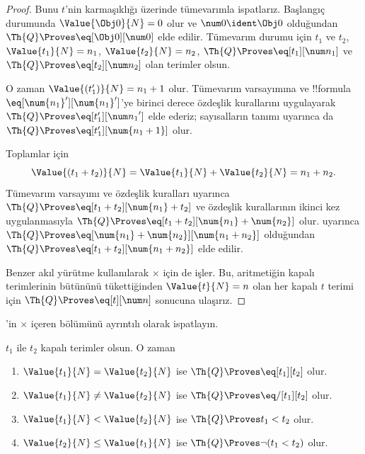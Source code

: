 \documentclass[../../../include/open-logic-section]{subfiles}
\begin{document}
\begin{proof}
Bunu $t$'nin karmaşıklığı üzerinde tümevarımla ispatlarız. Başlangıç
durumunda $\Value{\Obj 0}{N}=0$ olur ve $\num 0\ident\Obj 0$ olduğundan
$\Th{Q} \Proves \eq[\Obj 0][\num 0]$ elde edilir.
%
Tümevarım durumu için $t_1$ ve $t_2$,
$\Value{t_1}{N}=n_1$, $\Value{t_2}{N}=n_2$,
$\Th{Q} \Proves \eq[t_1][\num n_1]$ ve
$\Th{Q} \Proves \eq[t_2][\num n_2]$ olan terimler olsun.

O zaman $\Value{(t_1')}{N}=n_1+1$ olur. Tümevarım varsayımına ve
!!{formula} $\eq[\num{n_1}'][\num{n_1}']$'ye birinci derece özdeşlik
kurallarını uygulayarak $\Th{Q} \Proves \eq[t_1'][{\num n_1}']$ elde
ederiz; sayısalların tanımı uyarınca da
$\Th{Q} \Proves \eq[t_1'][\num{n_1+1}]$ olur.

Toplamlar için
\[
      \Value{(t_1 + t_2)}{N}
    = \Value{t_1}{N} + \Value{t_2}{N}
    = n_1 + n_2.
\]
Tümevarım varsayımı ve özdeşlik kuralları uyarınca
$\Th{Q} \Proves \eq[t_1+t_2][\num{n_1}+t_2]$ ve özdeşlik kurallarının
ikinci kez uygulanmasıyla
$\Th{Q} \Proves \eq[t_1+t_2][\num{n_1}+\num{n_2}]$ olur.
 uyarınca
$\Th{Q} \Proves \eq[\num{n_1}+\num{n_2}][\num{n_1+n_2}]$ olduğundan
$\Th{Q} \Proves \eq[t_1+t_2][\num{n_1+n_2}]$ elde edilir.

Benzer akıl yürütme  kullanılarak
$\times$ için de işler.
%
Bu, aritmetiğin kapalı terimlerinin bütününü tükettiğinden
$\Value{t}{N}=n$ olan her kapalı $t$ terimi için
$\Th{Q} \Proves \eq[t][\num n]$ sonucuna ulaşırız.
\end{proof}

\begin{prob}
'in $\times$ içeren bölümünü ayrıntılı olarak
ispatlayın.
\end{prob}

\begin{lem}
$t_1$ ile $t_2$ kapalı terimler olsun. O zaman
\begin{enumerate}
\item $\Value{t_1}{N}=\Value{t_2}{N}$ ise
    $\Th{Q} \Proves \eq[t_1][t_2]$ olur.
\item $\Value{t_1}{N}\neq\Value{t_2}{N}$ ise
    $\Th{Q} \Proves \eq/[t_1][t_2]$ olur.
\item $\Value{t_1}{N}<\Value{t_2}{N}$ ise
    $\Th{Q} \Proves t_1<t_2$ olur.
\item $\Value{t_2}{N}\leq\Value{t_1}{N}$ ise
    $\Th{Q} \Proves \lnot(t_1<t_2)$ olur.
\end{enumerate}
\end{lem}
\end{document}
